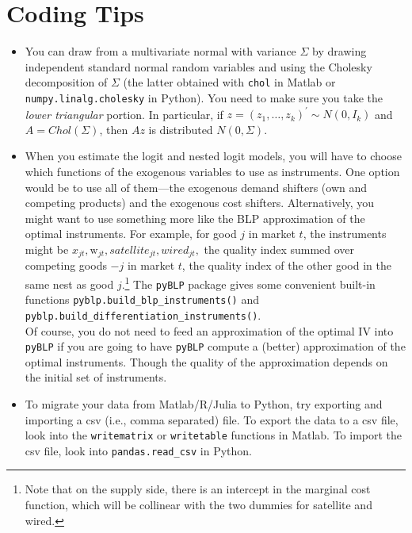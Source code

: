 \documentclass[english,11pt]{article}
\begin{document}
\section{Coding Tips}
\begin{itemize}
 
 \item You can draw from a multivariate normal with variance $\Sigma $ by
drawing independent standard normal random variables and using the Cholesky
decomposition of $\Sigma $ (the latter obtained with \texttt{chol} in Matlab or \texttt{numpy.linalg.cholesky} in Python). You need to make sure you take the \textit{lower triangular} portion.
In particular, if $z=(z_{1},\ldots ,z_{k})^{\prime }\sim N(0,I_{k})$ and $%
A=Chol(\Sigma )$, then $Az$ is distributed $N(0,\Sigma )$.


\item When you estimate the logit and nested logit models, you will have to choose which functions of the exogenous variables to use as instruments.  One option would be to use all of them---the exogenous demand shifters (own and competing products) and the exogenous cost shifters. Alternatively, you might want to use something more like the BLP approximation of the optimal instruments. For example,  for good $j$ in market $t$, the instruments might be $x_{jt},\text{w}_{jt}, satellite_{jt}, wired_{jt},$ the quality index summed over competing goods $-j$ in market $t$, the quality index of the other good in the same nest as good $j$.\footnote{ Note that on the supply side, there is an intercept in the marginal cost function, which will be collinear with the two dummies for satellite and wired.} The \texttt{pyBLP} package gives some convenient built-in functions \texttt{pyblp.build\_blp\_instruments()} and \texttt{pyblp.build\_differentiation\_instruments()}.\\


Of course, you do not need to feed an approximation of the optimal IV into \texttt{pyBLP} if you are going to have \texttt{pyBLP} compute a (better) approximation of the optimal instruments. Though the quality of the approximation depends on the initial set of instruments.


\item To migrate your data from
Matlab/R/Julia  to Python, try exporting and importing a csv (i.e., comma separated)
file.  To export the  data to a csv file, look into the \texttt{writematrix}
or \texttt{writetable} functions in Matlab. To import the csv file, look
into \texttt{pandas.read\_csv} in Python.



\end{itemize}
\end{document}
